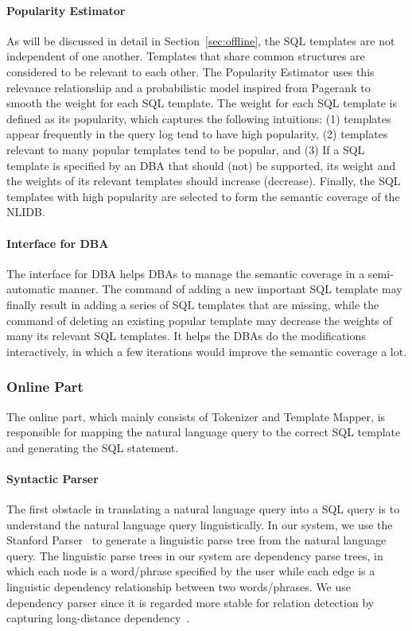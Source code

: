 \documentclass{vldb}
\begin{document}
\paragraph*{Popularity Estimator}
As will be discussed in detail in Section~\ref{sec:offline}, the SQL templates are not independent of one another.  Templates that share common structures are considered to be relevant to each other.  The Popularity Estimator uses this relevance relationship and a probabilistic model inspired from Pagerank to smooth the weight for each SQL template.  The weight for each SQL template is defined as its popularity, which captures the following intuitions: (1) templates appear frequently in the query log tend to have high popularity, (2) templates relevant to many popular templates tend to be popular, and (3) If a SQL template is specified by an DBA that should (not) be supported, its weight and the weights of its relevant templates should increase (decrease).  Finally, the SQL templates with high popularity are selected to form the semantic coverage of the NLIDB.  

\paragraph*{Interface for DBA}
The interface for DBA helps DBAs to manage the semantic coverage in a semi-automatic manner.  The command of adding a new important SQL template may finally result in adding a series of SQL templates that are missing, while the command of deleting an existing popular template may decrease the weights of many its relevant SQL templates.  It helps the DBAs do the modifications interactively, in which a few iterations would improve the semantic coverage a lot.  

\subsubsection{Online Part}
The online part, which mainly consists of Tokenizer and Template Mapper, is responsible for mapping the natural language query to the correct SQL template and generating the SQL statement.  

\paragraph*{Syntactic Parser}
The first obstacle in translating a natural language query into a SQL query is to understand the natural language query linguistically.  In our system, we use the Stanford Parser~\cite{Marneffe06generatingtyped} to generate a linguistic parse tree from the natural language query.  The linguistic parse trees in our system are dependency parse trees, in which each node is a word/phrase specified by the user while each edge is a linguistic dependency relationship between two words/phrases.  We use dependency parser since it is regarded more stable for relation detection by capturing long-distance dependency~\cite{DBLP:journals/sigmod/NakasholeWS13}.  
\end{document}
